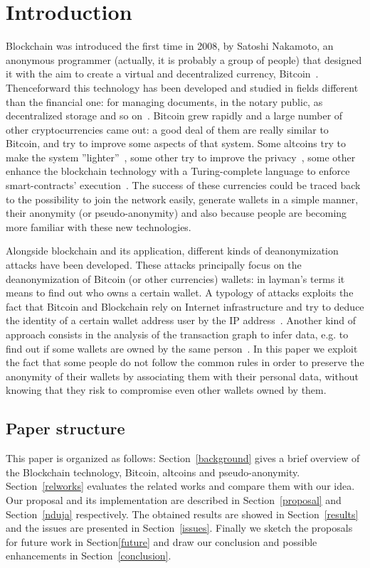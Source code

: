 \section{Introduction}
Blockchain was introduced the first time in 2008, by Satoshi Nakamoto, an
anonymous programmer (actually, it is probably a group of people) that
designed it with the aim to create a virtual and decentralized currency,
Bitcoin~\cite{bib:satoshi}.
Thenceforward this technology has been developed and
studied in fields different than the financial one: for managing documents, in
the notary public, as decentralized storage and so on~\cite{bib:air}.
Bitcoin grew
rapidly and a large number of other cryptocurrencies came out:
a good deal of them are really
similar to Bitcoin, and try to improve some aspects of that system. Some
altcoins try to make the system ''lighter''~\cite{bib:litecoin:wiki},
some other try to improve the privacy~\cite{bib:zerocoin:white_paper,
bib:zerocash:white_paper,
bib:monero:white_paper}, some other enhance the blockchain technology with a
Turing-complete language to enforce smart-contracts'
execution~\cite{bib:ethereum:whitepaper}.
The success of these
currencies could be traced back to the possibility to join the network easily,
generate wallets in a simple manner,
their anonymity (or pseudo-anonymity) and also because people are
becoming more familiar with these new technologies.


Alongside blockchain and its application, different kinds of deanonymization
attacks have been developed.
These attacks principally focus on the
deanonymization of Bitcoin (or other currencies) wallets: in layman's terms
it means to find out who owns a certain wallet.
A typology of attacks exploits the fact that Bitcoin and Blockchain rely
on Internet infrastructure and try to deduce the identity of a certain wallet
address user by the IP address~\cite{bib:deanon}.
Another kind of approach consists in the analysis of the transaction graph
to infer data, e.g. to find out if some wallets are owned by the same
person~\cite{bib:fistful}.
In this paper we exploit the fact that some people do not follow the common
rules in order to preserve the anonymity of their wallets by associating them
with their personal data, without knowing that they risk to compromise even
other wallets owned by them.


\subsection{Paper structure}
This paper is organized as follows: Section~\ref{background} gives a brief
overview of the Blockchain technology, Bitcoin, altcoins and pseudo-anonymity.
Section~\ref{relworks} evaluates the related works and compare them
with our idea. Our proposal and its implementation are described
in Section~\ref{proposal} and Section~\ref{nduja} respectively.
The obtained results are showed in Section~\ref{results} and the issues
are presented in Section~\ref{issues}. 
Finally we sketch the proposals for future work in Section\ref{future} and draw
our conclusion and possible enhancements in Section~\ref{conclusion}.
